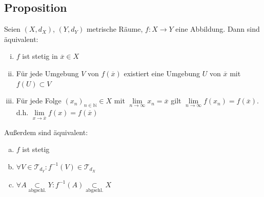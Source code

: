 \subsection[Proposition über unterschiedliche Charakterisierungen von Stetigkeit]{Proposition} %
\label{sub:32}
Seien $(X,d_X)$, $(Y, d_Y)$ metrische Räume, $f : X \to Y$ eine Abbildung. Dann sind äquivalent:
\begin{enumerate}[(i)]
	\item \label{stet:1}$f$ ist stetig in $\overline{x}\in X $
	\item \label{stet:2} Für jede Umgebung $V$ von $f(\overline{x})$ existiert eine Umgebung $U$ von $\overline{x}$ mit $f(U) \subset V$
	\item \label{stet:3} Für jede Folge $(x_n)_{n \in \mathds{N}} \in X$ mit $\lim\limits_{ n \to \infty} x_n = \overline{x} $ gilt 
	$\lim\limits_{ n \to \infty} f(x_n) = f(\overline{x})$. \\
	d.h. $\lim\limits_{ x \to \overline{x} } f(x)= f(\overline{x}) $
\end{enumerate}
Außerdem sind äquivalent:
\begin{enumerate}[(a)]
	\item \label{stet:a} $f$ ist stetig
	\item \label{stet:b} $\forall V \in \mathcal{T}_{d_Y} : f^{-1}(V) \in \mathcal{T}_{d_X}$
	\item \label{stet:c} $\forall A \underset{\text{abgschl.}}{\subset} Y :  f^{-1} (A) \underset{\text{abgschl.}}{\subset} X$
\end{enumerate}
